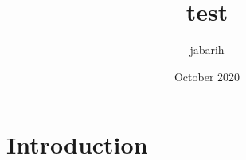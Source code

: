 \documentclass{article}
\title{test}
\author{jabarih }
\date{October 2020}
\begin{document}
\maketitle

\section{Introduction}
\end{document}

